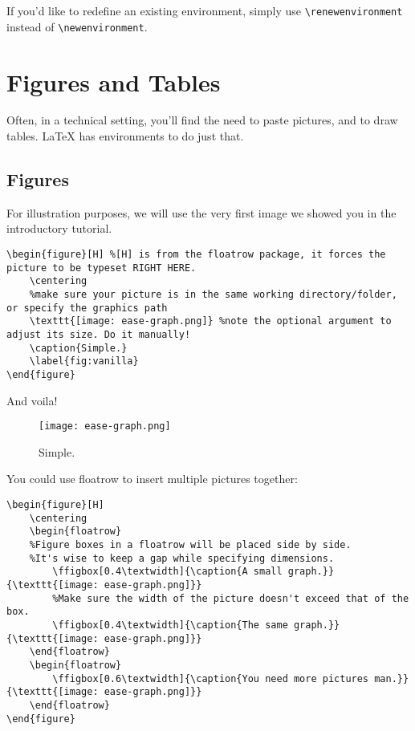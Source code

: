 \documentclass[12pt, letterpaper]{article}
\theoremstyle{remark}
\begin{document}
If you'd like to redefine an existing environment, simply use \verb!\renewenvironment! instead of \verb!\newenvironment!.

\section{Figures and Tables}
Often, in a technical setting, you'll find the need to paste pictures, and to draw tables. \LaTeX{} has environments to do just that. 
\subsection{Figures}
For illustration purposes, we will use the very first image we showed you in the introductory tutorial.
\begin{lstlisting}
\begin{figure}[H] %[H] is from the floatrow package, it forces the picture to be typeset RIGHT HERE.
    \centering 
    %make sure your picture is in the same working directory/folder, or specify the graphics path
    \texttt{[image: ease-graph.png]} %note the optional argument to adjust its size. Do it manually!
    \caption{Simple.}
    \label{fig:vanilla}
\end{figure}
\end{lstlisting}
And voila!
\begin{figure}[H] %
    \centering
    \texttt{[image: ease-graph.png]} %
    \caption{Simple.}
    \label{fig:vanilla}
\end{figure}

You could use floatrow to insert multiple pictures together:
\begin{lstlisting}
\begin{figure}[H]
    \centering
    \begin{floatrow}
    %Figure boxes in a floatrow will be placed side by side.
    %It's wise to keep a gap while specifying dimensions.
        \ffigbox[0.4\textwidth]{\caption{A small graph.}}{\texttt{[image: ease-graph.png]}}
        %Make sure the width of the picture doesn't exceed that of the box.
        \ffigbox[0.4\textwidth]{\caption{The same graph.}}{\texttt{[image: ease-graph.png]}}
    \end{floatrow}
    \begin{floatrow}
        \ffigbox[0.6\textwidth]{\caption{You need more pictures man.}}{\texttt{[image: ease-graph.png]}}
    \end{floatrow}
\end{figure}
\end{lstlisting}
\end{document}
